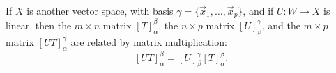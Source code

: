 \begin{fact}
	If $X$ is another vector space, with basis $\gamma = \{\vec{x}_1, \dots,
	\vec{x}_p\}$, and if $U : W \rightarrow X$ is linear, then the $m \times n$
	matrix ${[T]}_\alpha^\beta$, the $n \times p$ matrix ${[U]}_\beta^\gamma$, and
	the $m \times p$ matrix ${[UT]}_\alpha^\gamma$ are related by matrix
	multiplication:
	\[
		{[UT]}_\alpha^\beta = {[U]}_\beta^\gamma {[T]}_\alpha^\beta.
	\]
\end{fact}
